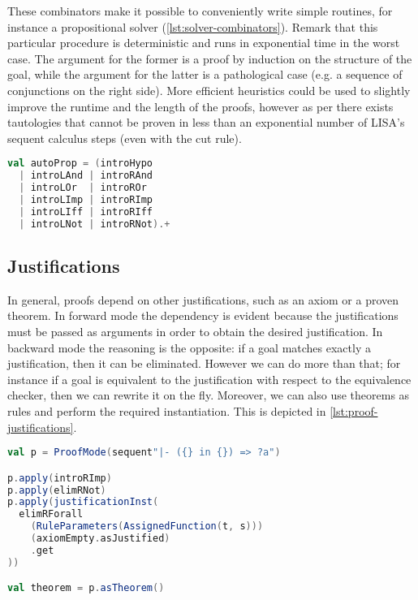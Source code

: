 These combinators make it possible to conveniently write simple routines, for instance a propositional solver (\autoref{lst:solver-combinators}). Remark that this particular procedure is deterministic and runs in exponential time in the worst case. The argument for the former is a proof by induction on the structure of the goal, while the argument for the latter is a pathological case (e.g. a sequence of conjunctions on the right side). More efficient heuristics could be used to slightly improve the runtime and the length of the proofs, however as per \cite{Krajicek1994} there exists tautologies that cannot be proven in less than an exponential number of LISA's sequent calculus steps (even with the cut rule).

\begin{lstlisting}[language=Scala,caption={[Propositional solver]{A propositional solver written using exclusively rules and tactic combinators.}},label={lst:solver-combinators},captionpos=b]
val autoProp = (introHypo
  | introLAnd | introRAnd
  | introLOr  | introROr
  | introLImp | introRImp
  | introLIff | introRIff
  | introLNot | introRNot).+
\end{lstlisting}

\subsection{Justifications}

In general, proofs depend on other justifications, such as an axiom or a proven theorem. In forward mode the dependency is evident because the justifications must be passed as arguments in order to obtain the desired justification. In backward mode the reasoning is the opposite: if a goal matches exactly a justification, then it can be eliminated. However we can do more than that; for instance if a goal is equivalent to the justification with respect to the equivalence checker, then we can rewrite it on the fly. Moreover, we can also use theorems as rules and perform the required instantiation. This is depicted in \autoref{lst:proof-justifications}.

\begin{lstlisting}[language=Scala,caption={[Proof with justifications]{Example of a proof with justifications.}},label={lst:proof-justifications},captionpos=b]
val p = ProofMode(sequent"|- ({} in {}) => ?a")

p.apply(introRImp)
p.apply(elimRNot)
p.apply(justificationInst(
  elimRForall
    (RuleParameters(AssignedFunction(t, s)))
    (axiomEmpty.asJustified)
    .get
))

val theorem = p.asTheorem()
\end{lstlisting}


